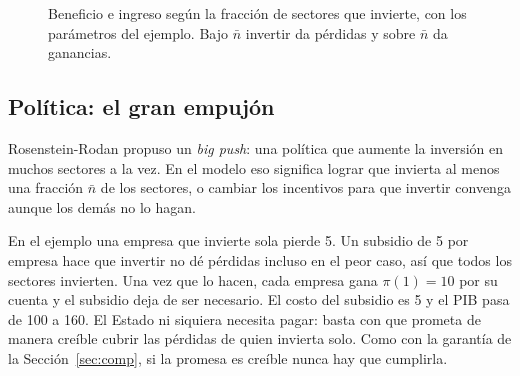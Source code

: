 \documentclass[12pt,letterpaper]{article}
\newcommand{\pL}{100}        %
\newcommand{\pA}{2}          %
\newcommand{\pw}{1.5}        %
\newcommand{\pF}{20}         %
\begin{document}
\begin{figure}[htb]
\centering
{}\hfill
{}
\caption{Beneficio e ingreso según la fracción de sectores que invierte, con los parámetros del ejemplo. Bajo $\bar n$ invertir da pérdidas y sobre $\bar n$ da ganancias.}
\label{fig:bp}
\end{figure}

\subsection{Política: el gran empujón}

Rosenstein-Rodan propuso un \emph{big push}: una política que aumente la inversión en muchos sectores a la vez. En el modelo eso significa lograr que invierta al menos una fracción $\bar n$ de los sectores, o cambiar los incentivos para que invertir convenga aunque los demás no lo hagan.

\begin{intuicion}
En el ejemplo una empresa que invierte sola pierde 5. Un subsidio de 5 por empresa hace que invertir no dé pérdidas incluso en el peor caso, así que todos los sectores invierten. Una vez que lo hacen, cada empresa gana $\pi(1)=10$ por su cuenta y el subsidio deja de ser necesario. El costo del subsidio es 5 y el PIB pasa de 100 a 160. El Estado ni siquiera necesita pagar: basta con que prometa de manera creíble cubrir las pérdidas de quien invierta solo. Como con la garantía de la Sección~\ref{sec:comp}, si la promesa es creíble nunca hay que cumplirla.
\end{intuicion}
\end{document}
